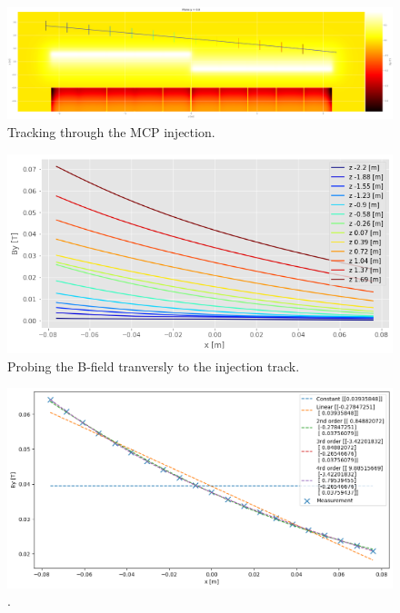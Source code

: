 \begin{figure}[H]
\centering
\includegraphics[width=1.0\textwidth]{02_Simulation/images/MCP_track.png}
\caption{Tracking through the MCP injection.}
\label{fig:mcp_track}
\end{figure}

\begin{figure}[H]
\centering
\includegraphics[width=1.0\textwidth]{02_Simulation/images/MCP_track_2.png}
\caption{Probing the B-field tranversly to the injection track.}
\label{fig:mcp_track}
\end{figure}



\begin{figure}[H]
\centering
\includegraphics[width=1.0\textwidth]{02_Simulation/images/fit_of_bfield.png}
\caption{.}
\label{fig:fit_bfield}
\end{figure}

